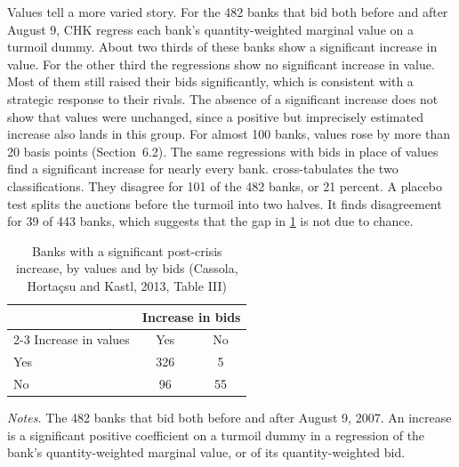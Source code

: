 Values tell a more varied story. For the 482 banks that bid both before and after August 9, CHK regress each
bank's quantity-weighted marginal value on a turmoil dummy. About two thirds of these banks show a significant
increase in value. For the other third the regressions show no significant increase in value. Most of them
still raised their bids significantly, which is consistent with a strategic response to their rivals. The
absence of a significant increase does not show that values were unchanged, since a positive but imprecisely
estimated increase also lands in this group. For almost 100 banks, values rose by more than 20 basis points (Section~6.2). The same
regressions with bids in place of values find a significant increase for nearly every bank.
 cross-tabulates the two classifications. They disagree for 101 of the 482 banks, or
21 percent. A placebo test splits the auctions before the turmoil into two halves. It finds disagreement for
39 of 443 banks, which suggests that the gap in \cref{tab:15-chk-classify} is not due to chance.

\begin{table}[htbp]
\centering
\caption{Banks with a significant post-crisis increase, by values and by bids (Cassola, Horta\c{c}su and Kastl,
2013, Table III)}
\label{tab:15-chk-classify}
\small
\begin{tabular}{lcc}
\toprule
 & \multicolumn{2}{c}{Increase in bids}\\
\cmidrule(lr){2-3}
Increase in values & Yes & No\\
\midrule
Yes & 326 & 5\\
No & 96 & 55\\
\bottomrule
\end{tabular}

\smallskip
\begin{minipage}{0.75\textwidth}
\footnotesize \textit{Notes.} The 482 banks that bid both before and after August 9, 2007. An increase is a
significant positive coefficient on a turmoil dummy in a regression of the bank's quantity-weighted marginal
value, or of its quantity-weighted bid.
\end{minipage}
\end{table}

